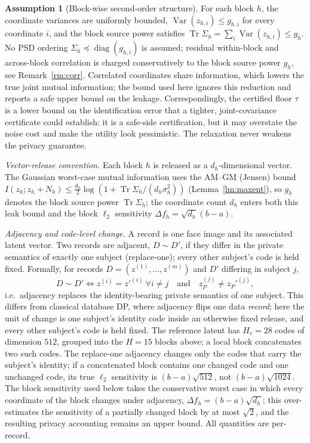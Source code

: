 \documentclass{ieeetj}
\theoremstyle{plain}
\theoremstyle{definition}
\newtheorem{assumption}{Assumption}
\begin{document}
\begin{assumption}[Block-wise second-order structure]
\label{as:indep}
For each block $h$, the coordinate variances are uniformly bounded,
$\operatorname{Var}(z_{h,i})\le g_{h,i}$ for every coordinate $i$, and the
block source power satisfies
$\operatorname{Tr}\Sigma_h=\sum_i\operatorname{Var}(z_{h,i})\le g_h$. No PSD
ordering $\Sigma_h\preceq\operatorname{diag}(g_{h,i})$ is assumed; residual
within-block and across-block correlation is charged conservatively to the
block source power $g_h$, see Remark~\ref{rm:corr}. Correlated
coordinates share information, which lowers the true joint mutual information;
the bound used here ignores this reduction and reports a safe upper bound on
the leakage. Correspondingly, the certified floor $\tau$ is a lower bound on
the identification error that a tighter, joint-covariance certificate could
establish: it is a safe-side certification, but it may overstate the noise cost
and make the utility look pessimistic. The relaxation never weakens the privacy
guarantee.
\end{assumption}

\emph{Vector-release convention.} Each block $h$ is released as a
$d_h$-dimensional vector. The Gaussian worst-case mutual information uses the
AM--GM (Jensen) bound
$I(z_h;z_h+N_h)\le\tfrac{d_h}{2}\log(1+\operatorname{Tr}\Sigma_h/(d_h\sigma_h^2))$
(Lemma~\ref{lm:maxent}), so $g_h$ denotes the block source power
$\operatorname{Tr}\Sigma_h$; the coordinate count $d_h$ enters both this leak
bound and the block $\ell_2$ sensitivity $\Delta f_h=\sqrt{d_h}(b-a)$.

\emph{Adjacency and code-level change.} A record is one face image and its
associated latent vector. Two records are adjacent, $D\sim D'$, if they differ
in the private semantics of exactly one subject (replace-one); every other
subject's code is held fixed. Formally, for records $D=(z^{(1)},\ldots,z^{(m)})$
and $D'$ differing in subject $j$,
\begin{equation}
D\sim D'\iff z^{(i)}=z'^{(i)}\ \forall i\ne j
\quad\text{and}\quad z_P^{(j)}\ne z_P'^{(j)},
\label{eq:adjacency}
\end{equation}
i.e.\ adjacency replaces the identity-bearing private semantics of one subject.
This differs from classical database DP, where adjacency flips one data
\emph{record}; here the unit of change is one subject's identity code inside an
otherwise fixed release, and every other subject's code is held fixed.
The reference latent has $H_{\mathrm c}=28$ codes of dimension $512$, grouped
into the $H=15$ blocks above; a local block concatenates two such codes. The
replace-one adjacency changes only the codes that carry the subject's identity;
if a concatenated block contains one changed code and one unchanged code, its
true $\ell_2$ sensitivity is $(b-a)\sqrt{512}$, not $(b-a)\sqrt{1024}$. The
block sensitivity used below takes the conservative worst case in which every
coordinate of the block changes under adjacency,
$\Delta f_h=(b-a)\sqrt{d_h}$; this over-estimates the sensitivity of a
partially changed block by at most $\sqrt{2}$, and the resulting privacy
accounting remains an upper bound. All quantities are per-record.
\end{document}

